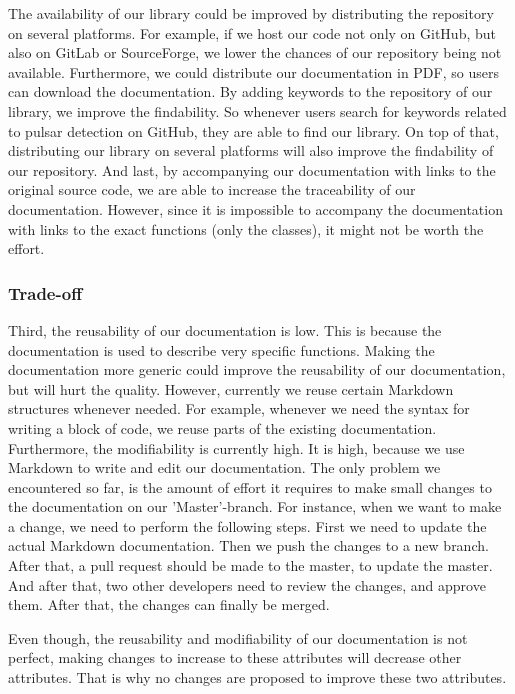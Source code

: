 \documentclass{article}
\begin{document}
    The availability of our library could be improved by distributing the repository on several platforms. For example, if we host our code not only on GitHub, but also on
    GitLab or SourceForge, we lower the chances of our repository being not available. Furthermore, we could distribute our documentation in PDF, so users can download the
    documentation. By adding keywords to the repository of our library, we improve the findability. So whenever users search for keywords related to pulsar detection on GitHub, 
    they are able to find our library. On top of that, distributing our library on several platforms will also improve the findability of our repository.
    And last, by accompanying our documentation with links to the original source code, we are able to increase the traceability of our documentation. However, since it is
    impossible to accompany the documentation with links to the exact functions (only the classes), it might not be worth the effort.

    \subsubsection{Trade-off}

    Third, the reusability of our documentation is low. This is because the documentation is used to describe very specific functions. Making the documentation more generic could
    improve the reusability of our documentation, but will hurt the quality. However, currently we reuse certain Markdown structures whenever needed. For example, whenever we need the
    syntax for writing a block of code, we reuse parts of the existing documentation. Furthermore, the modifiability is currently high. It is high, because we use Markdown to
    write and edit our documentation. The only problem we encountered so far, is the amount of effort it requires to make small changes to the documentation on our 'Master'-branch.
    For instance, when we want to make a change, we need to perform the following steps. First we need to update the actual Markdown documentation. Then we push the changes to a new branch.
    After that, a pull request should be made to the master, to update the master. And after that, two other developers need to review the changes, and approve them. After that, the
    changes can finally be merged.

    Even though, the reusability and modifiability of our documentation is not perfect, making changes to increase to these attributes will decrease other attributes. That is why
    no changes are proposed to improve these two attributes.
\end{document}
